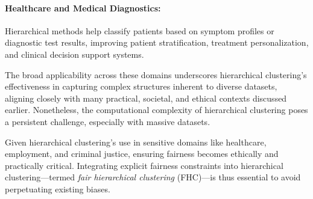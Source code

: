 \paragraph{Healthcare and Medical Diagnostics:} Hierarchical
methods help classify patients based on symptom profiles or
diagnostic test results, improving patient stratification,
treatment personalization, and clinical decision support systems.

The broad applicability across these domains underscores hierarchical
clustering’s effectiveness in capturing complex structures inherent
to diverse datasets, aligning closely with many practical, societal,
and ethical contexts discussed earlier. Nonetheless, the
computational complexity of hierarchical clustering poses a
persistent challenge, especially with massive datasets.

Given hierarchical clustering’s use in sensitive domains like
healthcare, employment, and criminal justice, ensuring fairness
becomes ethically and practically critical. Integrating explicit
fairness constraints into hierarchical clustering—termed \textit{fair
hierarchical clustering} (FHC)—is thus essential to avoid
perpetuating existing biases.